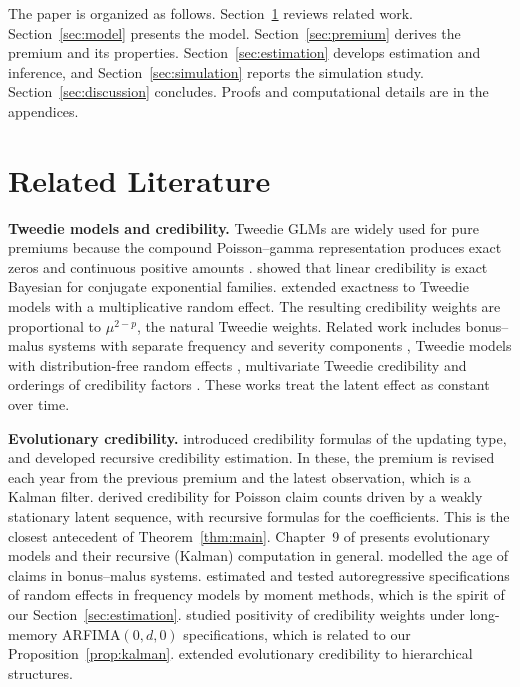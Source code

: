 \documentclass[mathematics,article,submit,moreauthors]{Definitions/mdpi}
\begin{document}
The paper is organized as follows. Section~\ref{sec:literature} reviews related work. Section~\ref{sec:model} presents the model. Section~\ref{sec:premium} derives the premium and its properties. Section~\ref{sec:estimation} develops estimation and inference, and Section~\ref{sec:simulation} reports the simulation study. Section~\ref{sec:discussion} concludes. Proofs and computational details are in the appendices.

\section{Related Literature}\label{sec:literature}

\textbf{Tweedie models and credibility.} Tweedie GLMs are widely used for pure premiums because the compound Poisson--gamma representation produces exact zeros and continuous positive amounts \citep{jorgensen1994fitting,smyth2002fitting}. \citet{jewell1974credible} showed that linear credibility is exact Bayesian for conjugate exponential families. \citet{ohlsson2006exact} extended exactness to Tweedie models with a multiplicative random effect. The resulting credibility weights are proportional to $\mu^{2-p}$, the natural Tweedie weights. Related work includes bonus--malus systems with separate frequency and severity components \citep{frangos2001design}, Tweedie models with distribution-free random effects \citep{ma2018tweedie}, multivariate Tweedie credibility \citep{jeong2024tweedie} and orderings of credibility factors \citep{ahn2021ordering}. These works treat the latent effect as constant over time.

\textbf{Evolutionary credibility.} \citet{gerber1975} introduced credibility formulas of the updating type, and \citet{sundt1981} developed recursive credibility estimation. In these, the premium is revised each year from the previous premium and the latest observation, which is a Kalman filter. \citet{albrecht1985} derived credibility for Poisson claim counts driven by a weakly stationary latent sequence, with recursive formulas for the coefficients. This is the closest antecedent of Theorem~\ref{thm:main}. Chapter~9 of \citet{buhlmann2005course} presents evolutionary models and their recursive (Kalman) computation in general. \citet{pinquet2001} modelled the age of claims in bonus--malus systems. \citet{bolance2003} estimated and tested autoregressive specifications of random effects in frequency models by moment methods, which is the spirit of our Section~\ref{sec:estimation}. \citet{pinquet2020} studied positivity of credibility weights under long-memory ARFIMA$(0,d,0)$ specifications, which is related to our Proposition~\ref{prop:kalman}. \citet{taylor2018} extended evolutionary credibility to hierarchical structures.
\end{document}
